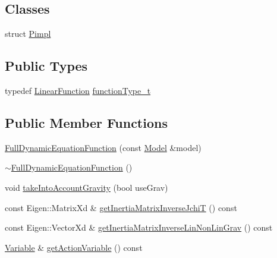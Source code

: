 \subsection*{Classes}
\begin{DoxyCompactItemize}
\item 
struct \hyperlink{structFullDynamicEquationFunction_1_1Pimpl}{Pimpl}
\end{DoxyCompactItemize}
\subsection*{Public Types}
\begin{DoxyCompactItemize}
\item 
typedef \hyperlink{classocra_1_1LinearFunction}{Linear\+Function} \hyperlink{group__constraint_ga3f72eb3c4529d2c19ef39928f5e57262}{function\+Type\+\_\+t}
\end{DoxyCompactItemize}
\subsection*{Public Member Functions}
\begin{DoxyCompactItemize}
\item 
\hyperlink{group__constraint_ga778bffa6d85a494b3ee0c499400573a6}{Full\+Dynamic\+Equation\+Function} (const \hyperlink{classocra_1_1Model}{Model} \&model)
\item 
\hyperlink{group__constraint_gab3c2d35bef3c4d8733b7ab0e9ff48bfc}{$\sim$\+Full\+Dynamic\+Equation\+Function} ()
\item 
void \hyperlink{group__constraint_ga673fd9a47a249d84ce527011a06417aa}{take\+Into\+Account\+Gravity} (bool use\+Grav)
\item 
const Eigen\+::\+Matrix\+Xd \& \hyperlink{group__constraint_gaf5eec6352d53ef9682fa281f2692add2}{get\+Inertia\+Matrix\+Inverse\+JchiT} () const 
\item 
const Eigen\+::\+Vector\+Xd \& \hyperlink{group__constraint_ga3ac88fe8128c6ceb390057abb933e602}{get\+Inertia\+Matrix\+Inverse\+Lin\+Non\+Lin\+Grav} () const 
\item 
\hyperlink{classocra_1_1Variable}{Variable} \& \hyperlink{group__constraint_gaab7728b0f686c4ae63784c4a72871f13}{get\+Action\+Variable} () const 
\end{DoxyCompactItemize}
